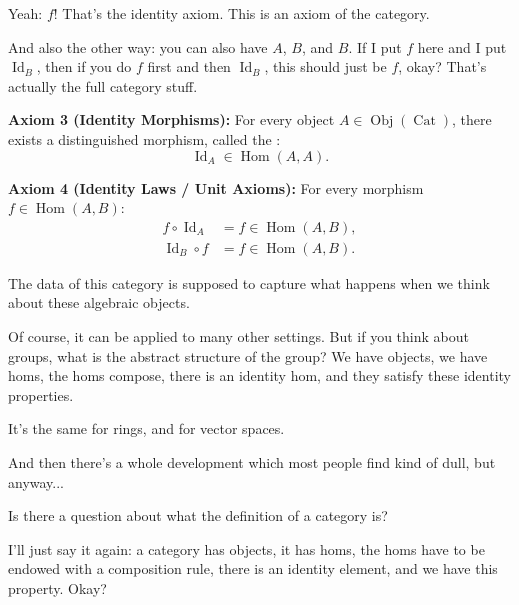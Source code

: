 \begin{speech}[01:14:06 - 01:16:30]
Yeah: $f$!  That's the identity axiom. This is an axiom of the category.

And also the other way: you can also have $A$, $B$, and $B$.  If I put $f$ here and I put $\operatorname{Id}_B$,  then if you do $f$ first and then $\operatorname{Id}_B$, this should just be $f$, okay?  That's actually the full category stuff.
\end{speech}

\begin{content}
\textbf{Axiom 3 (Identity Morphisms):} For every object $A \in \operatorname{Obj}(\operatorname{Cat})$, there exists a distinguished morphism, called the :
\[
\operatorname{Id}_A \in \operatorname{Hom}(A, A).
\]

\textbf{Axiom 4 (Identity Laws / Unit Axioms):}
For every morphism $f \in \operatorname{Hom}(A, B)$:
\begin{align}
f \circ \operatorname{Id}_A &= f \in \operatorname{Hom}(A, B), \label{eq:left-id} \\
\operatorname{Id}_B \circ f &= f \in \operatorname{Hom}(A, B). \label{eq:right-id}
\end{align}
\end{content}

\begin{speech}[01:16:30 - 01:17:26]
The data of this category is supposed to capture what happens when we think about these algebraic objects.

Of course, it can be applied to many other settings. But if you think about groups, what is the abstract structure of the group? We have objects, we have homs, the homs compose, there is an identity hom, and they satisfy these identity properties.

It's the same for rings, and for vector spaces.

And then there's a whole development which most people find kind of dull, but anyway...

Is there a question about what the definition of a category is?

I'll just say it again: a category has objects, it has homs, the homs have to be endowed with a composition rule, there is an identity element, and we have this property. Okay?
\end{speech}

